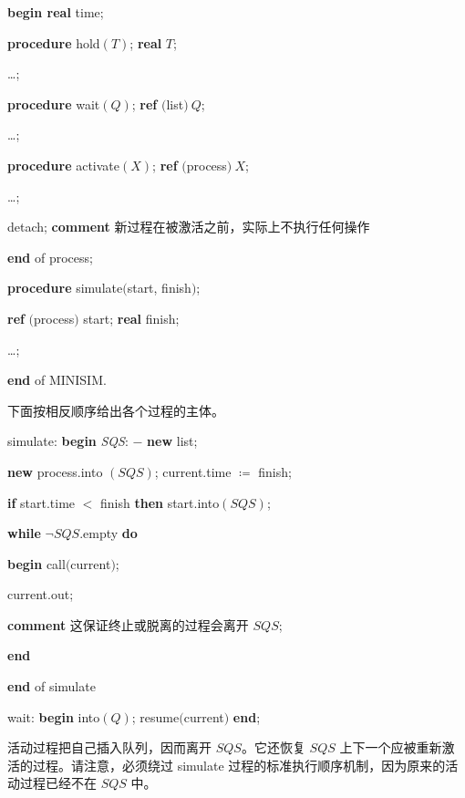 \documentclass[twoside,11pt,fontset=none]{ctexbook}
\begin{document}
\quad \quad \quad \quad \textbf{begin real} time;

\quad \quad \quad \quad \quad \textbf{procedure} hold$(T)$; \textbf{real} $T$;

\quad \quad \quad \quad \quad \quad \dots;

\quad \quad \quad \quad \quad \textbf{procedure} wait$(Q)$; \textbf{ref} $($list$)\ Q$;

\quad \quad \quad \quad \quad \quad \dots;

\quad \quad \quad \quad \quad \textbf{procedure} activate$(X)$; \textbf{ref} $($process$)\ X$;

\quad \quad \quad \quad \quad \quad \dots;

\parindent\quad \quad \quad \quad \quad detach; \textbf{comment} 新过程在被激活之前，实际上不执行任何操作

\quad \quad \quad \quad \textbf{end} of process;

\quad \quad \quad \textbf{procedure} simulate$($start, finish$)$;

\quad \quad \quad \quad \textbf{ref} $($process$)$ start; \textbf{real} finish;

\quad \quad \quad \quad \quad \dots;

\quad \quad \textbf{end} of MINISIM.

\noindent
下面按相反顺序给出各个过程的主体。

\quad simulate: \textbf{begin} \textit{SQS}: $-$ \textbf{new} list;

\quad \quad \textbf{new} process.into $(SQS)$; current.time $\coloneq$ finish;

\quad \quad \quad \textbf{if} start.time $<$ finish \textbf{then} start.into$(SQS)$;

\quad \quad \quad \textbf{while} $\neg SQS$.empty \textbf{do}

\quad \quad \quad \quad \textbf{begin} call$($current$)$;

\quad \quad \quad \quad \quad current.out;

\parindent\quad \quad \quad \quad \quad \textbf{comment} 这保证终止或脱离的过程会离开 $SQS$;

\quad \quad \quad \quad \textbf{end}

\quad \quad \textbf{end} of simulate

\quad wait: \textbf{begin} into$(Q)$; resume$($current$)$ \textbf{end};

\noindent
活动过程把自己插入队列，因而离开 $SQS$。它还恢复 $SQS$ 上下一个应被重新激活的过程。请注意，必须绕过 simulate 过程的标准执行顺序机制，因为原来的活动过程已经不在 $SQS$ 中。
\end{document}

